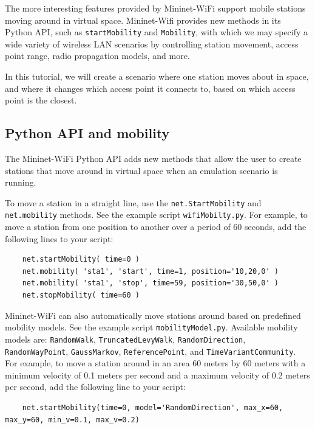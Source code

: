 The more interesting features provided by Mininet-WiFi support mobile stations moving around in virtual space. Mininet-Wifi provides new methods in its Python API, such as \texttt{startMobility} and \texttt{Mobility}, with which we may specify a wide variety of wireless LAN scenarios by controlling station movement, access point range, radio propagation models, and more.

In this tutorial, we will create a scenario where one station moves about in space, and where it changes which access point it connects to, based on which access point is the closest.

\subsection{Python API and mobility}

The Mininet-WiFi Python API adds new methods that allow the user to create stations that move around in virtual space when an emulation scenario is running.

To move a station in a straight line, use the \texttt{net.StartMobility} and \texttt{net.mobility} methods. See the example script \texttt{wifiMobilty.py}. For example, to move a station from one position to another over a period of 60 seconds, add the following lines to your script:

\begin{verbatim}
    net.startMobility( time=0 )
    net.mobility( 'sta1', 'start', time=1, position='10,20,0' )
    net.mobility( 'sta1', 'stop', time=59, position='30,50,0' )
    net.stopMobility( time=60 )
\end{verbatim}

    

Mininet-WiFi can also automatically move stations around based on predefined mobility models. See the example script \texttt{mobilityModel.py}. Available mobility models are: \texttt{RandomWalk}, \texttt{TruncatedLevyWalk}, \texttt{RandomDirection}, \texttt{RandomWayPoint}, \texttt{GaussMarkov}, \texttt{ReferencePoint}, and \texttt{TimeVariantCommunity}. For example, to move a station around in an area 60 meters by 60 meters with a minimum velocity of 0.1 meters per second and a maximum velocity of 0.2 meters per second, add the following line to your script:

\begin{verbatim}
    net.startMobility(time=0, model='RandomDirection', max_x=60, max_y=60, min_v=0.1, max_v=0.2)
\end{verbatim}    

